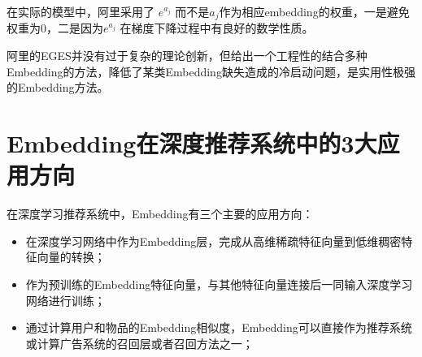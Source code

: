 \documentclass[12pt]{article}
\begin{document}
在实际的模型中，阿里采用了 $e^{a_j}$ 而不是$a_j$作为相应embedding的权重，一是避免权重为0，二是因为$e^{a_j}$ 在梯度下降过程中有良好的数学性质。

阿里的EGES并没有过于复杂的理论创新，但给出一个工程性的结合多种Embedding的方法，降低了某类Embedding缺失造成的冷启动问题，是实用性极强的Embedding方法。


\section{Embedding在深度推荐系统中的3大应用方向
\cite{Three_Application_Of_Embedding_In_Reference_System}}

在深度学习推荐系统中，Embedding有三个主要的应用方向：
\begin{itemize}
\setlength{\itemsep}{0pt}
\setlength{\parsep}{0pt}
\setlength{\parskip}{0pt}
    \item 在深度学习网络中作为Embedding层，完成从高维稀疏特征向量到低维稠密特征向量的转换；
    \item 作为预训练的Embedding特征向量，与其他特征向量连接后一同输入深度学习网络进行训练；
    \item 通过计算用户和物品的Embedding相似度，Embedding可以直接作为推荐系统或计算广告系统的召回层或者召回方法之一；
\end{itemize}
\end{document}
